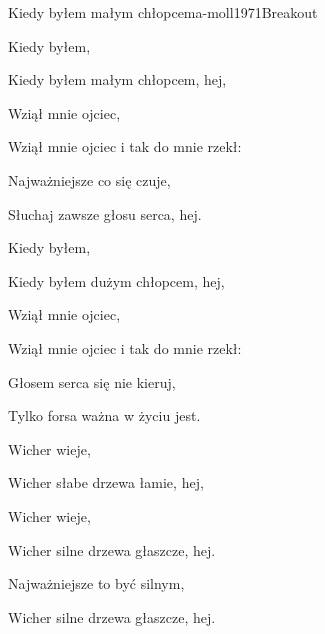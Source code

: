 \documentclass[a4paper,draft]{book}
\begin{document}
\begin{song}{Kiedy byłem małym chłopcem}{a-moll}{1971}{Breakout}{}{}
	\begin{SBVerse}
	Kiedy byłem,

	Kiedy byłem małym chłopcem, hej,

	Wziął mnie ojciec,

	Wziął mnie ojciec i tak do mnie rzekł:

	Najważniejsze co się czuje,

	Słuchaj zawsze głosu serca, hej.
	\end{SBVerse}
	\begin{SBVerse}
	Kiedy byłem,

	Kiedy byłem dużym chłopcem, hej,

	Wziął mnie ojciec,

	Wziął mnie ojciec i tak do mnie rzekł:

	Głosem serca się nie kieruj,

	Tylko forsa ważna w życiu jest.
	\end{SBVerse}
	\begin{SBVerse}
	Wicher wieje,

	Wicher słabe drzewa łamie, hej,

	Wicher wieje,

	Wicher silne drzewa głaszcze, hej.

	Najważniejsze to być silnym,

	Wicher silne drzewa głaszcze, hej.
	\end{SBVerse}
\end{song}
\end{document}
